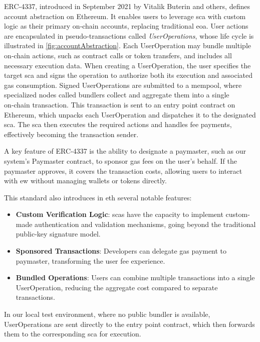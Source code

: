 ERC‑4337, introduced in September 2021 by Vitalik Buterin and others\cite{buterin2021erc}, defines account abstraction on Ethereum. It enables users to leverage \acrlong{sca} with custom logic as their primary on‑chain accounts, replacing traditional \acrshort{eoa}. User actions are encapsulated in pseudo‑transactions called \textit{UserOperations}, whose life cycle is illustrated in \cref{fig:accountAbstraction}. Each UserOperation may bundle multiple on‑chain actions, such as contract calls or token transfers, and includes all necessary execution data. When creating a UserOperation, the user specifies the target \acrshort{sca} and signs the operation to authorize both its execution and associated gas consumption.
Signed UserOperations are submitted to a \gls{mempool}, where specialized nodes called bundlers collect and aggregate them into a single on‑chain transaction. This transaction is sent to an entry point contract on Ethereum, which unpacks each UserOperation and dispatches it to the designated \acrshort{sca}. The \acrlong{sca} then executes the required actions and handles fee payments, effectively becoming the transaction sender.

A key feature of ERC‑4337 is the ability to designate a paymaster, such as our system’s Paymaster contract, to sponsor gas fees on the user’s behalf. If the paymaster approves, it covers the transaction costs, allowing users to interact with \acrlong{ew} without managing wallets or tokens directly.

This standard also introduces in \acrlong{eth} several notable features:
\begin{itemize}
    \item \textbf{Custom Verification Logic}: \acrlong{sca}s have the capacity to implement custom-made authentication and validation mechanisms, going beyond the traditional public-key signature model.
    \item \textbf{Sponsored Transactions}: Developers can delegate gas payment to paymaster, transforming the user fee experience.
    \item \textbf{Bundled Operations}: Users can combine multiple transactions into a single UserOperation, reducing the aggregate cost compared to separate transactions.
\end{itemize}

In our local test environment, where no public bundler is available, UserOperations are sent directly to the entry point contract, which then forwards them to the corresponding \acrshort{sca} for execution.

